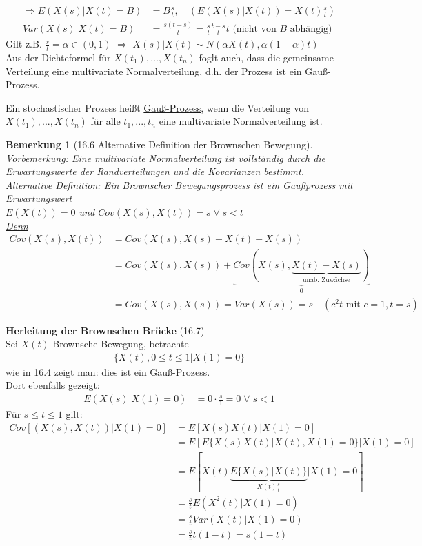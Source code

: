 \documentclass[a4paper,openany]{book}
\theoremstyle{mytheoremstyle}
\newtheorem*{bem}{Bemerkung}
\theoremstyle{mytheoremstyle2}
\begin{document}
\begin{align*}
  \Rightarrow E(X(s)|X(t)=B)
  &=B \frac{s }{t},\quad (E(X(s)|X(t))=X(t)\frac{s }{t})\\
  Var(X(s)|X(t)=B)&=\frac{s(t-s)}{t}=\frac{s }{t}\frac{t-s}{t}t\text{ (nicht von $B  $ abhängig)}
\end{align*}
Gilt z.B. $\frac{s}{t}=\alpha \in (0,1)$ $\Rightarrow  $ $X(s)|X(t)\sim N(\alpha X(t),\alpha (1-\alpha )t) $ \\
Aus der Dichteformel für $X(t_1),...,X(t_n) $ foglt auch, dass die gemeinsame Verteilung eine multivariate Normalverteilung, d.h. der Prozess ist ein Gauß-Prozess.
\begin{defi}{16.5}{}
  Ein stochastischer Prozess heißt \underline{Gauß-Prozess}, wenn die Verteilung von $X(t_1),...,X(t_n) $ für alle $t_1,...,t_n $ eine multivariate Normalverteilung ist.
\end{defi}
\begin{bem}[16.6 Alternative Definition der Brownschen Bewegung]
  \underline{Vorbemerkung}: Eine multivariate Normalverteilung ist vollständig durch die Erwartungswerte der Randverteilungen und die Kovarianzen bestimmt.\\
  \underline{Alternative Definition}: Ein Brownscher Bewegungsprozess ist ein Gaußprozess mit Erwartungswert \\
  $E(X(t))=0$ und $Cov(X(s),X(t))=s \;\forall\;s <t$ \\
  \underline{Denn} 
  \begin{align*}
    Cov(X(s),X(t))&=Cov(X(s),X(s)+X(t)-X(s))\\
                  &=Cov(X(s),X(s))+\underbrace{Cov(X(s),\underbrace{X(t)-X(s)}_{\text{unab. Zuwächse}})}_{0}\\
                  &=Cov(X(s),X(s))=Var(X(s))=s \quad (c^2t \text{ mit }c=1,t=s)
  \end{align*}
\end{bem}
\noindent \textbf{Herleitung der Brownschen Brücke} (16.7)\\
Sei $X(t) $ Brownsche Bewegung, betrachte
\begin{align*}
  \{X(t),0 \leq t \leq 1|X(1)=0\}
\end{align*}
wie in 16.4 zeigt man: dies ist ein Gauß-Prozess. \\
Dort ebenfalls gezeigt: 
\begin{align*}
  E(X(s)|X(1)=0)
  &=0 \cdot \frac{s}{1}=0\;\forall\;s <1
\end{align*}
Für $s \leq t \leq 1 $ gilt: 
\begin{align*}
  Cov[(X(s),X(t))|X(1)=0]
  &=E[X(s)X(t)|X(1)=0]\\
  &=E[E\{X(s)X(t)|X(t),X(1)=0\}|X(1)=0]\\
  &=E[X(t)\underbrace{E\{X(s)|X(t)\}}_{X(t)\frac{s }{t}}|X(1)=0]\\
  &=\frac{s}{t}E (X^2(t)|X(1)=0)\\
  &=\frac{s}{t}Var(X(t)|X(1)=0)\\
  &=\frac{s}{t}t(1-t)=s(1-t)
\end{align*}
\end{document}
